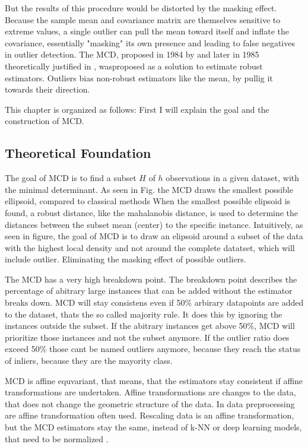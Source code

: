 But the results of this procedure would be distorted by the masking effect.
Because the sample mean and covariance matrix are themselves sensitive to extreme values, a single outlier can pull the mean toward itself and inflate the covariance, essentially "masking" its own presence and leading to false negatives in outlier detection.
The MCD, proposed in 1984 by \citet{rousseeuw1984least} and later in 1985 theoretically justified in \citet{rousseeuw1985multivariate}, wasproposed as a solution to estimate robust estimators. 
Outliers bias non-robust estimators like the mean, by pullig it towards their direction.


This chapter is organized as follows: First I will explain the goal and the construction of MCD.


\subsection*{Theoretical Foundation}
The goal of MCD is to find a subset $H$ of $h$  observations in a given dataset, with the minimal determinant.
As seen in Fig. the MCD draws the smallest possible ellipsoid, compared to classical methods 
When the smallest possible elipsoid is found, a robust distance, like the mahalanobis distance, is used to determine the distances between the subset mean (center) to the specific instance.
Intuitively,  as seen in figure, the goal of MCD is to draw an elipsoid around a subset of the data with the highest local density and not around the complete datatset, which will include outlier. 
Eliminating the masking effect of possible outliers.




The MCD has a very high breakdown point.
The breakdown point describes the percentage of abitrary large instances that can be added without the estimator breaks down.
MCD will stay consistens even if 50\% arbirary datapoints are added to the dataset, thats the so called majority rule.
It does this by ignoring the instances outside the subset.
If the abitrary instances get above 50\%, MCD will prioritize those instances and not the subset anymore.
If the outlier ratio does exceed 50\% those cant be named outliers anymore, because they reach the status of inliers, because they are the mayority class. 


MCD is affine equvariant, that means, that the estimators stay consistent if affine transformations are undertaken.
Affine transformations are changes to the data, that does not change the geometric structure of the data.
In data preprocessing are affine transformation often used.
Rescaling data is an affine transformation, but the MCD estimators stay the same, instead of k-NN or deep learning models, that need to be normalized \citet{hubert2018minimum}.
  


